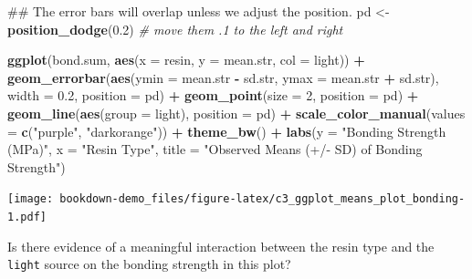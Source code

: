 \documentclass[]{book}
\newenvironment{Shaded}{\begin{snugshade}}{\end{snugshade}}
\newcommand{\KeywordTok}[1]{\textcolor[rgb]{0.13,0.29,0.53}{\textbf{#1}}}
\newcommand{\DataTypeTok}[1]{\textcolor[rgb]{0.13,0.29,0.53}{#1}}
\newcommand{\DecValTok}[1]{\textcolor[rgb]{0.00,0.00,0.81}{#1}}
\newcommand{\FloatTok}[1]{\textcolor[rgb]{0.00,0.00,0.81}{#1}}
\newcommand{\StringTok}[1]{\textcolor[rgb]{0.31,0.60,0.02}{#1}}
\newcommand{\CommentTok}[1]{\textcolor[rgb]{0.56,0.35,0.01}{\textit{#1}}}
\newcommand{\OperatorTok}[1]{\textcolor[rgb]{0.81,0.36,0.00}{\textbf{#1}}}
\newcommand{\NormalTok}[1]{#1}
\theoremstyle{definition}
\theoremstyle{definition}
\theoremstyle{definition}
\theoremstyle{remark}
\begin{document}
\begin{Shaded}
\begin{Highlighting}[]
\NormalTok{## The error bars will overlap unless we adjust the position.}
\NormalTok{pd <-}\StringTok{ }\KeywordTok{position_dodge}\NormalTok{(}\FloatTok{0.2}\NormalTok{) }\CommentTok{# move them .1 to the left and right}

\KeywordTok{ggplot}\NormalTok{(bond.sum, }\KeywordTok{aes}\NormalTok{(}\DataTypeTok{x =}\NormalTok{ resin, }\DataTypeTok{y =}\NormalTok{ mean.str, }\DataTypeTok{col =}\NormalTok{ light)) }\OperatorTok{+}
\StringTok{    }\KeywordTok{geom_errorbar}\NormalTok{(}\KeywordTok{aes}\NormalTok{(}\DataTypeTok{ymin =}\NormalTok{ mean.str }\OperatorTok{-}\StringTok{ }\NormalTok{sd.str, }
                      \DataTypeTok{ymax =}\NormalTok{ mean.str }\OperatorTok{+}\StringTok{ }\NormalTok{sd.str),}
                  \DataTypeTok{width =} \FloatTok{0.2}\NormalTok{, }\DataTypeTok{position =}\NormalTok{ pd) }\OperatorTok{+}
\StringTok{    }\KeywordTok{geom_point}\NormalTok{(}\DataTypeTok{size =} \DecValTok{2}\NormalTok{, }\DataTypeTok{position =}\NormalTok{ pd) }\OperatorTok{+}\StringTok{ }
\StringTok{    }\KeywordTok{geom_line}\NormalTok{(}\KeywordTok{aes}\NormalTok{(}\DataTypeTok{group =}\NormalTok{ light), }\DataTypeTok{position =}\NormalTok{ pd) }\OperatorTok{+}
\StringTok{    }\KeywordTok{scale_color_manual}\NormalTok{(}\DataTypeTok{values =} \KeywordTok{c}\NormalTok{(}\StringTok{"purple"}\NormalTok{, }\StringTok{"darkorange"}\NormalTok{)) }\OperatorTok{+}
\StringTok{    }\KeywordTok{theme_bw}\NormalTok{() }\OperatorTok{+}
\StringTok{    }\KeywordTok{labs}\NormalTok{(}\DataTypeTok{y =} \StringTok{"Bonding Strength (MPa)"}\NormalTok{, }\DataTypeTok{x =} \StringTok{"Resin Type"}\NormalTok{,}
         \DataTypeTok{title =} \StringTok{"Observed Means (+/- SD) of Bonding Strength"}\NormalTok{)}
\end{Highlighting}
\end{Shaded}

\texttt{[image: bookdown-demo\_files/figure-latex/c3\_ggplot\_means\_plot\_bonding-1.pdf]}

Is there evidence of a meaningful interaction between the resin type and
the \texttt{light} source on the bonding strength in this plot?
\end{document}

